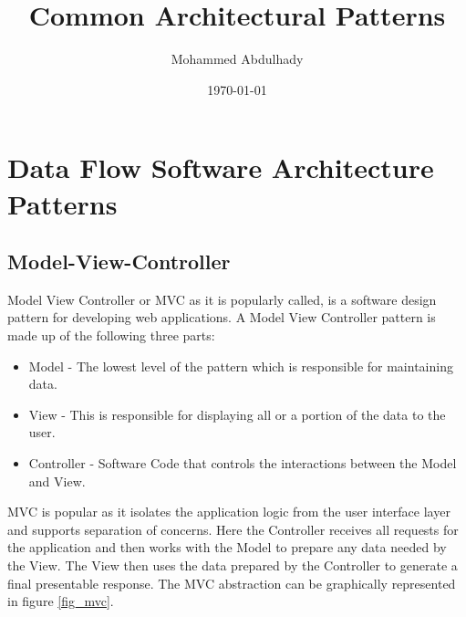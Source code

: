 \documentclass{article}
\begin{document}
\title{Common Architectural Patterns}
\author{Mohammed Abdulhady}
\date{\today}
\maketitle

\tableofcontents
\newpage

\section{Data Flow Software Architecture Patterns}
\subsection{Model-View-Controller}

Model View Controller or MVC as it is popularly called, is a software design pattern for developing web applications. A Model View Controller pattern is made up of the following three parts:

\begin{itemize}

\item Model - The lowest level of the pattern which is responsible for maintaining data.
\item View - This is responsible for displaying all or a portion of the data to the user.
\item Controller - Software Code that controls the interactions between the Model and View.

\end{itemize}

\noindent MVC is popular as it isolates the application logic from the user interface layer and supports separation of concerns. Here the Controller receives all requests for the application and then works with the Model to prepare any data needed by the View. The View then uses the data prepared by the Controller to generate a final presentable response. The MVC abstraction can be graphically represented in figure \ref{fig_mvc}.\\\\
\end{document}
